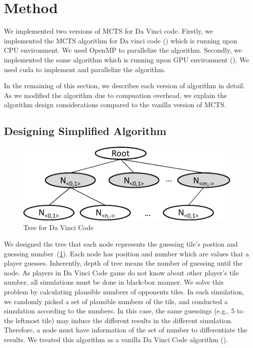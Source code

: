 
\section{Method}
We implemented two versions of MCTS for Da Vinci code. 
Firstly, we implemented the MCTS algorithm for Da vinci code (\cpu) which is running upon CPU environment.
We used OpenMP to parallelize the algorithm.
Secondly, we implemented the same algorithm which is running upon GPU environment (\gpu).
We used cuda to implement and parallelize the algorithm.

In the remaining of this section, we describes each version of algorithm in detail. 
As we modified the algorithm due to compuation overhead, we explain the algorithm design considerations compared to the vanilla version of MCTS.

\subsection{Designing Simplified Algorithm}

\begin{figure}
\includegraphics[width=0.95\columnwidth]{figures/base_tree.pdf}
\caption{Tree for Da Vinci Code}
\label{fig:base_tree}
\end{figure}

We designed the tree that each node represents the guessing tile's postion and guessing number~(\cref{fig:base_tree}).
Each node has position and number which are values that a player guesses.
Inherently, depth of tree means the number of guessing until the node.
As players in Da Vinci Code game do not know about other player's tile number, all simulations must be done in black-box manner.
We solve this problem by calculating plausible numbers of opponents tiles.
In each simulation, we randomly picked a set of plausible numbers of the tils, and conducted a simulation according to the numbers.
In this case, the same guessings (e.g., 5 to the leftmost tile) may induce the different results in the different simulation.
Therefore, a node must have information of the set of number to differentiate the results.
We treated this algorithm as a vanilla Da Vinci Code algorithm (\md).

